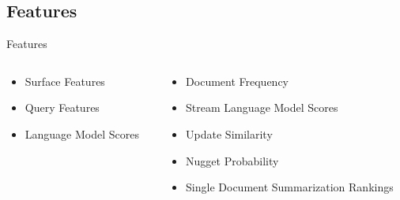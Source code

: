 \subsection{Features}
\begin{frame}{Features}
  \begin{columns}
      \begin{column}{.5\textwidth}
      \begin{itemize}
        \item Surface Features
        \item Query Features
        \item Language Model Scores
      \end{itemize}
    \end{column}
    \begin{column}{.5\textwidth}
      \begin{itemize}
        \item Document Frequency %
        \item Stream Language Model Scores %
        \item Update Similarity %
        \item Nugget Probability %
        \item Single Document Summarization Rankings %
      \end{itemize}
   \end{column}
  \end{columns}
\end{frame}


